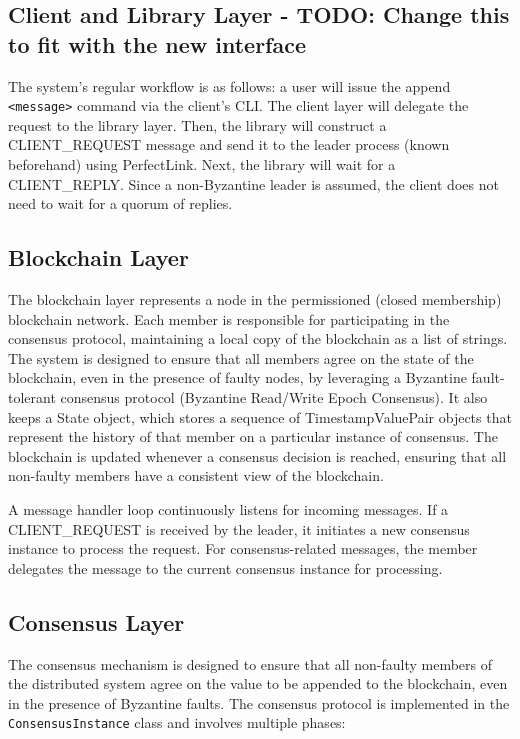 \documentclass[runningheads]{llncs}
\begin{document}
\subsection{Client and Library Layer - TODO: Change this to fit with the new interface}
The system's regular workflow is as follows: a user will issue the append \texttt{<message>} command via the client's CLI. The client layer will delegate the request to the library layer. Then, the library will construct a CLIENT\_REQUEST message and send it to the leader process (known beforehand) using PerfectLink. Next, the library will wait for a CLIENT\_REPLY. Since a non-Byzantine leader is assumed, the client does not need to wait for a quorum of replies.

\subsection{Blockchain Layer}
The blockchain layer represents a node in the permissioned (closed membership) blockchain network. Each member is responsible for participating in the consensus protocol, maintaining a local copy of the blockchain as a list of strings. The system is designed to ensure that all members agree on the state of the blockchain, even in the presence of faulty nodes, by leveraging a Byzantine fault-tolerant consensus protocol (Byzantine Read/Write Epoch Consensus). It also keeps a State object, which stores a sequence of TimestampValuePair objects that represent the history of that member on a particular instance of consensus. The blockchain is updated whenever a consensus decision is reached, ensuring that all non-faulty members have a consistent view of the blockchain.

A message handler loop continuously listens for incoming messages. If a CLIENT\_REQUEST is received by the leader, it initiates a new consensus instance to process the request. For consensus-related messages, the member delegates the message to the current consensus instance for processing.

\subsection{Consensus Layer}
The consensus mechanism is designed to ensure that all non-faulty members of the distributed system agree on the value to be appended to the blockchain, even in the presence of Byzantine faults. The consensus protocol is implemented in the \texttt{ConsensusInstance} class and involves multiple phases:
\end{document}
